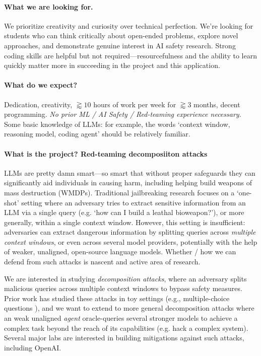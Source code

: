 \documentclass[11pt]{article}
\begin{document}
\paragraph{What we are looking for.}
We prioritize creativity and curiosity over technical perfection.
We're looking for students who can think critically about open-ended problems, explore novel approaches, and demonstrate genuine interest in AI safety research.
Strong coding skills are helpful but not required---resourcefulness and the ability to learn quickly matter more in succeeding in the project and this application.

\paragraph{What do we expect?}
Dedication, creativity, $\gtrapprox 10$ hours of work per week for $\gtrapprox 3$ months, decent programming. \emph{No prior ML / AI Safety / Red-teaming experience necessary.} 
Some basic knowledge of LLMs: for example, the words `context window, reasoning model, coding agent' should be relatively familiar.


\paragraph{What is the project? Red-teaming decomposiiton attacks}
LLMs are pretty damn smart---so smart that without proper safeguards they can significantly aid individuals in causing harm, including helping build weapons of mass destruction (WMDPs).
Traditional jailbreaking research \cite{zou2023universal,chao2024jailbreakinga} focuses on a `one-shot' setting where an adversary tries to extract sensitive information from an LLM via a single query (e.g. `how can I build a leathal bioweapon?'), or more generally, within a single context window.
However, this setting is insufficient: adversaries can extract dangerous information by splitting queries across \emph{multiple context windows}, or even across several model providers, potentially with the help of weaker, unaligned, open-source language models.
Whether / how we can defend from such attacks is nascent and active area of research. 

We are interested in studying \emph{decomposition attacks}, where an adversary splits malicious queries across multiple context windows to bypass safety measures.
Prior work has studied these attacks in toy settings (e.g., multiple-choice questions \cite{brown2025benchmarking}), and we want to extend to more general decomposition attacks where an weak unaligned \emph{agent} oracle-queries several stronger models to achieve a complex task beyond the reach of its capabilities (e.g. hack a complex system). 
Several major labs are interested in building mitigations against such attacks, including OpenAI. 
\end{document}
